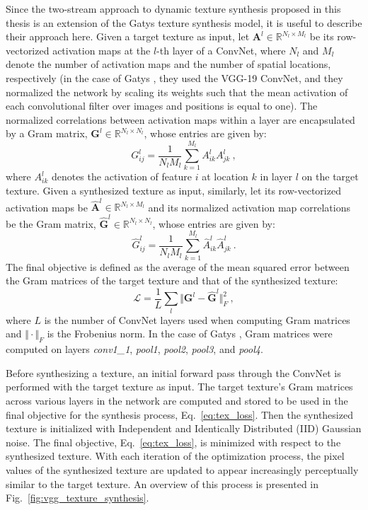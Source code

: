 Since the two-stream approach to dynamic texture synthesis proposed in this thesis is an extension of the Gatys \etal \cite{gatys2015} texture 
synthesis model, it is useful to describe their approach here. Given a target texture as input,
let $\mathbf{A}^{l} \in \mathbb{R}^{N_l\times M_l}$
be its row-vectorized activation maps at the $l$-th layer of a ConvNet, where $N_l$ and $M_l$ denote the number of
activation maps and the number of spatial locations,
respectively (in the case of Gatys \etal \cite{gatys2015}, they used the VGG-19 ConvNet, and they normalized the network by scaling its weights such that the mean activation of each convolutional filter over images and positions is equal to one).
The normalized correlations between activation maps
within a layer are encapsulated by a Gram matrix,
$\mathbf{G}^l \in \mathbb{R}^{N_l \times N_l}$, whose entries are given by:
\begin{equation}
	G_{ij}^l = \frac{1}{N_l M_l} \sum_{k=1}^{M_l} A_{ik}^l A_{jk}^l\ ,
\end{equation}
where $A_{ik}^l$ denotes the activation of feature $i$ at
location $k$ in layer $l$ on the target texture.
Given a synthesized texture as input, similarly, let its row-vectorized activation maps
be $\hat{\mathbf{A}}^{l} \in \mathbb{R}^{N_l\times M_l}$ and its normalized
activation map correlations be the Gram matrix, $\hat{\mathbf{G}}^l \in \mathbb{R}^{N_l \times N_l}$, whose entries are given by:
\begin{equation}
	\hat{G}_{ij}^l = \frac{1}{N_l M_l} \sum_{k=1}^{M_l} \hat{A}_{ik}^l \hat{A}_{jk}^l\ .
\end{equation}
The final objective is defined as the average of the mean squared error between
the Gram matrices of the target texture and that of the synthesized texture:
\begin{equation}
   \mathcal{L} = \frac{1}{L} \sum_{l} \Vert \mathbf{G}^l - \hat{\mathbf{G}}^l \Vert^2_F\ ,
   \label{eq:tex_loss}
\end{equation}
where $L$ is the number of ConvNet layers used when computing Gram matrices
and $\Vert \cdot \Vert_F$ is the Frobenius norm. In the case of Gatys \etal \cite{gatys2015}, Gram matrices were computed on
layers \emph{conv1\_1}, \emph{pool1}, \emph{pool2}, \emph{pool3}, and \emph{pool4}.

Before synthesizing a texture, an initial forward pass through the ConvNet is
performed with the target texture as input. The target texture's Gram matrices
across various layers in the network are computed and stored to be used in the final objective for
the synthesis process, Eq.\ \ref{eq:tex_loss}. Then the synthesized texture is initialized with Independent and Identically Distributed (IID)
Gaussian noise. The final
objective, Eq.\ \ref{eq:tex_loss}, is minimized with respect to the synthesized texture. With each
iteration of the optimization process, the pixel values of the synthesized texture are updated to appear increasingly
perceptually similar to the target texture. An overview of this process is presented in Fig.\ \ref{fig:vgg_texture_synthesis}.
\clearpage

\clearpage

